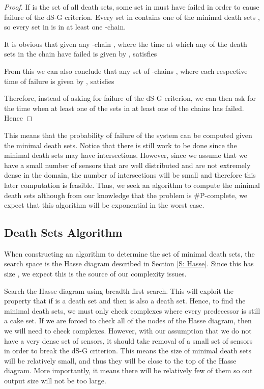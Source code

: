 \documentclass[10pt,twocolumn]{article} \usepackage{amsmath,epsf,amssymb,cite,pifont,amsthm, mathrsfs,epsfig,  bbm, amsthm,  setspace}
\renewcommand{\1}{\mathbbm{1}}
\begin{document}
\begin{proof}
If  is the set of all death sets, some set  in  must have failed in order to cause failure of the dS-G criterion.
Every set in  contains one of the minimal death sets ,
so every set in  is in at least one -chain.

It is obvious that given any -chain , where the time at which any of the death sets in the chain have failed is given by , satisfies

From this we can also conclude that any set of -chains , where each respective time of failure is given by , satisfies


Therefore, instead of asking for failure of the dS-G criterion, we can then ask for the time when at least one of the
sets in at least one of the chains has failed.
Hence
	

\end{proof}








This means that the probability of failure of the system can be computed given the minimal death sets.
Notice that there is still work to be done since the minimal death sets may have intersections.
However, since we assume that we have a small number of sensors that are well distributed
and are not extremely dense in the domain,
the number of intersections will be small and therefore this later computation is feasible.
Thus, we seek an algorithm to compute the minimal death sets
although from our knowledge that the problem is \#P-complete,
we expect that this algorithm will be exponential in the worst case.


\subsection{Death Sets Algorithm}\label{S: Death Sets Algorithm}

When constructing an algorithm to determine the set of minimal death sets, the search space is the Hasse diagram described in Section \ref{S: Hasse}.
Since this has size , we expect this is the source of our complexity issues.

Search the Hasse diagram using breadth first search.
This will exploit the property that if  is a death set and  then  is also a death set.
Hence, to find the minimal death sets, we must only check complexes where every predecessor is still a cake set.
If we are forced to check all of the nodes of the Hasse diagram, then we will need to check  complexes.
However, with our assumption that we do not have a very dense set of sensors, it should take removal of a small set of sensors in order to break the dS-G criterion.
This means the size of minimal death sets will be relatively small, and thus they will be close to the top of the Hasse diagram.
More importantly, it means there will be relatively few of them so out output size will not be too large.
\end{document}

